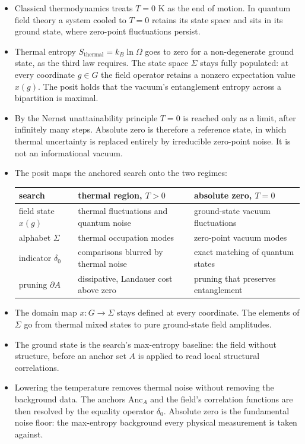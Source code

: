 \begin{itemize}
\item Classical thermodynamics treats $T = 0$ K as the end of motion. In quantum field theory a system
cooled to $T = 0$ retains its state space and sits in its ground state, where zero-point fluctuations
persist.

\item Thermal entropy $S_{\mathrm{thermal}} = k_B \ln \Omega$ goes to zero for a non-degenerate ground
state, as the third law requires. The state space $\Sigma$ stays fully populated: at every coordinate
$g \in G$ the field operator retains a nonzero expectation value $x(g)$. The posit holds that the
vacuum's entanglement entropy across a bipartition is maximal.

\item By the Nernst unattainability principle $T = 0$ is reached only as a limit, after infinitely
many steps. Absolute zero is therefore a reference state, in which thermal uncertainty is replaced
entirely by irreducible zero-point noise. It is not an informational vacuum.

\item The posit maps the anchored search onto the two regimes:

\begin{center}
\begin{tabular}{lll}
\toprule
search & thermal region, $T > 0$ & absolute zero, $T = 0$ \\
\midrule
field state $x(g)$ & thermal fluctuations and quantum noise & ground-state vacuum fluctuations \\
alphabet $\Sigma$ & thermal occupation modes & zero-point vacuum modes \\
indicator $\delta_0$ & comparisons blurred by thermal noise & exact matching of quantum states \\
pruning $\partial A$ & dissipative, Landauer cost above zero & pruning that preserves entanglement \\
\bottomrule
\end{tabular}
\end{center}

\item The domain map $x : G \to \Sigma$ stays defined at every coordinate. The elements of $\Sigma$ go
from thermal mixed states to pure ground-state field amplitudes.

\item The ground state is the search's max-entropy baseline: the field without structure, before
an anchor set $A$ is applied to read local structural correlations.

\item Lowering the temperature removes thermal noise without removing the background data. The
anchors $\mathrm{Anc}_A$ and the field's correlation functions are then resolved by the equality
operator $\delta_0$. Absolute zero is the fundamental noise floor: the max-entropy background every
physical measurement is taken against.
\end{itemize}

